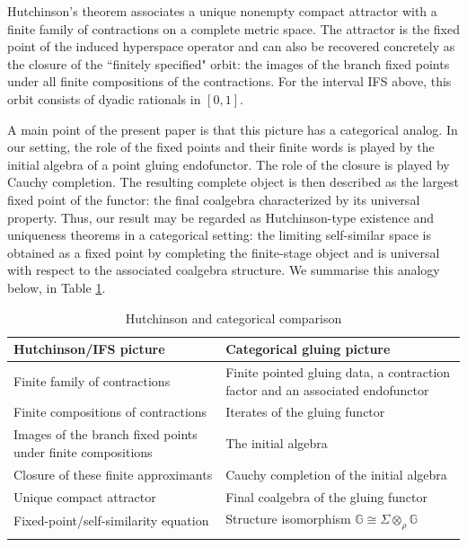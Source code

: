 \documentclass{sn-jnl}%
\theoremstyle{thmstyleone}%
\theoremstyle{thmstyletwo}%
\theoremstyle{thmstylethree}%
\newcommand{\M}{\Sigma}
\newcommand{\Fw}{\M\otimes_{\w}}
\newcommand{\w}{\rho}
\begin{document}
Hutchinson's theorem \cite{Hut} associates a unique nonempty compact attractor with a finite family of contractions on a complete metric space. The attractor is the fixed point of the induced hyperspace operator and can also be recovered
concretely as the closure of the ``finitely specified" orbit: the images of the branch fixed points under all finite compositions of the contractions. For the interval IFS above, this orbit consists of dyadic rationals in $[0,1]$.

A main point of the present paper is that this picture has a categorical analog.  In our setting, the role of the fixed points and their finite words is played by the initial algebra of a point gluing endofunctor.  The role of the closure is played by Cauchy completion. The resulting complete object is then described as the largest fixed point of the functor: the final coalgebra characterized by its universal property. Thus, our result may be regarded as Hutchinson-type existence and uniqueness theorems in a categorical setting: the limiting self-similar space is obtained as a fixed point by completing the finite-stage object and is universal with respect to the associated coalgebra structure. We summarise this analogy below, in Table \ref{tab:comparisonHutCat}.
\begin{table}[b]
    \centering
\renewcommand{\arraystretch}{1.25}
\begin{tabular}{>{\raggedright\arraybackslash}p{}|>{\raggedright\arraybackslash}p{}}
    \textbf{Hutchinson/IFS picture} & \textbf{Categorical gluing picture} \\
    \hline
    Finite family of contractions & Finite pointed gluing data, a contraction factor and an associated endofunctor \\
    Finite compositions of contractions & Iterates of the gluing functor \\
    Images of the branch fixed points under finite compositions & The initial algebra \\
    Closure of these finite approximants & Cauchy completion of the initial algebra \\
    Unique compact attractor & Final coalgebra of the gluing functor \\
    Fixed-point/self-similarity equation & Structure isomorphism $\mathbb{G}\cong \Fw \mathbb{G}$\\
    \botrule
\end{tabular}
\caption{Hutchinson and categorical comparison}
\label{tab:comparisonHutCat}
\end{table}
\end{document}

